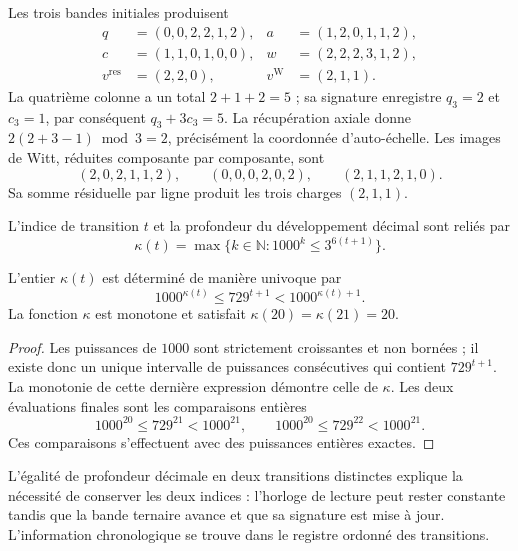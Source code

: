 \begin{example}
Les trois bandes initiales produisent
\begin{align*}
 q&=(0,0,2,2,1,2),&a&=(1,2,0,1,1,2),\\
 c&=(1,1,0,1,0,0),&w&=(2,2,2,3,1,2),\\
 v^{\mathrm{res}}&=(2,2,0),&v^{\mathrm W}&=(2,1,1).
\end{align*}
La quatrième colonne a un total \(2+1+2=5\) ; sa signature enregistre \(q_3=2\) et \(c_3=1\), par conséquent \(q_3+3c_3=5\).
La récupération axiale donne \(2(2+3-1)\bmod3=2\), précisément la coordonnée d'auto-échelle.
Les images de Witt, réduites composante par composante, sont
\[
 (2,0,2,1,1,2),\qquad
 (0,0,0,2,0,2),\qquad
 (2,1,1,2,1,0).
\]
Sa somme résiduelle par ligne produit les trois charges \((2,1,1)\).
\end{example}

\begin{definition}
L'indice de transition \(t\) et la profondeur du développement décimal sont
reliés par
\begin{equation}
 \kappa(t)=\max\{k\in\mathbb N:1000^k\leq3^{6(t+1)}\}.
 \label{act21:eq:df-reloj}
\end{equation}
\end{definition}

\begin{proposition}
\label{act21:prop:df-reloj}
L'entier \(\kappa(t)\) est déterminé de manière univoque par
\begin{equation}
 1000^{\kappa(t)}\leq729^{t+1}<1000^{\kappa(t)+1}.
 \label{act21:eq:df-reloj-cotas}
\end{equation}
La fonction \(\kappa\) est monotone et satisfait
\(\kappa(20)=\kappa(21)=20\).
\end{proposition}

\begin{proof}
Les puissances de \(1000\) sont strictement croissantes et non bornées ;
il existe donc un unique intervalle de puissances consécutives qui
contient \(729^{t+1}\). La monotonie de cette dernière expression démontre
celle de \(\kappa\). Les deux évaluations finales sont les comparaisons
entières
\[
 1000^{20}\leq729^{21}<1000^{21},\qquad
 1000^{20}\leq729^{22}<1000^{21}.
\]
Ces comparaisons s'effectuent avec des puissances entières exactes.
\end{proof}

L'égalité de profondeur décimale en deux transitions distinctes explique la nécessité de conserver les deux indices : l'horloge de lecture peut rester constante tandis que la bande ternaire avance et que sa signature est mise à jour. L'information chronologique se trouve dans le registre ordonné des transitions.

